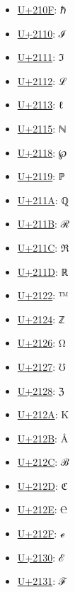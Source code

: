 \begin{itemize}
	\item \href{https://www.compart.com/en/unicode/U+210F}{U+210F}: ℏ
	\item \href{https://www.compart.com/en/unicode/U+2110}{U+2110}: ℐ
	\item \href{https://www.compart.com/en/unicode/U+2111}{U+2111}: ℑ
	\item \href{https://www.compart.com/en/unicode/U+2112}{U+2112}: ℒ
	\item \href{https://www.compart.com/en/unicode/U+2113}{U+2113}: ℓ
	\item \href{https://www.compart.com/en/unicode/U+2115}{U+2115}: ℕ
	\item \href{https://www.compart.com/en/unicode/U+2118}{U+2118}: ℘
	\item \href{https://www.compart.com/en/unicode/U+2119}{U+2119}: ℙ
	\item \href{https://www.compart.com/en/unicode/U+211A}{U+211A}: ℚ
	\item \href{https://www.compart.com/en/unicode/U+211B}{U+211B}: ℛ
	\item \href{https://www.compart.com/en/unicode/U+211C}{U+211C}: ℜ
	\item \href{https://www.compart.com/en/unicode/U+211D}{U+211D}: ℝ
	\item \href{https://www.compart.com/en/unicode/U+2122}{U+2122}: ™
	\item \href{https://www.compart.com/en/unicode/U+2124}{U+2124}: ℤ
	\item \href{https://www.compart.com/en/unicode/U+2126}{U+2126}: Ω
	\item \href{https://www.compart.com/en/unicode/U+2127}{U+2127}: ℧
	\item \href{https://www.compart.com/en/unicode/U+2128}{U+2128}: ℨ
	\item \href{https://www.compart.com/en/unicode/U+212A}{U+212A}: K
	\item \href{https://www.compart.com/en/unicode/U+212B}{U+212B}: Å
	\item \href{https://www.compart.com/en/unicode/U+212C}{U+212C}: ℬ
	\item \href{https://www.compart.com/en/unicode/U+212D}{U+212D}: ℭ
	\item \href{https://www.compart.com/en/unicode/U+212E}{U+212E}: ℮
	\item \href{https://www.compart.com/en/unicode/U+212F}{U+212F}: ℯ
	\item \href{https://www.compart.com/en/unicode/U+2130}{U+2130}: ℰ
	\item \href{https://www.compart.com/en/unicode/U+2131}{U+2131}: ℱ

\end{itemize}
